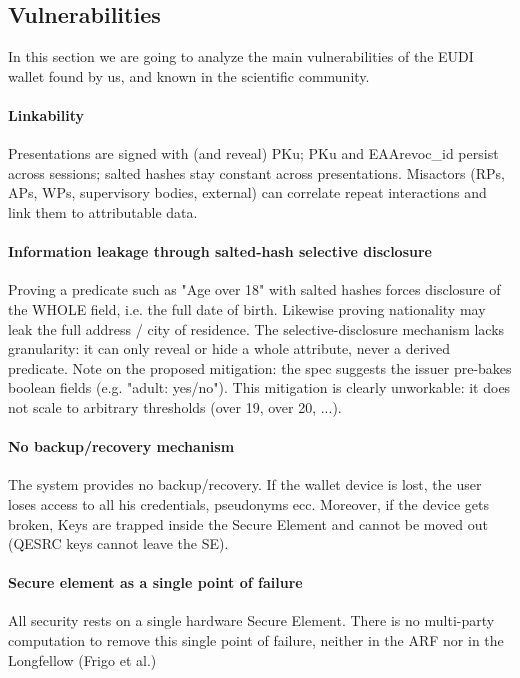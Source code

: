\documentclass{article}
\begin{document}
\subsection{Vulnerabilities}
\label{vulnerabilities}
In this section we are going to analyze the main vulnerabilities of the EUDI wallet found by us, and
known in the scientific community.

\paragraph{Linkability}
Presentations are signed with (and reveal) PKu; PKu and EAArevoc\_id persist
across sessions; salted hashes stay constant across presentations. Misactors
(RPs, APs, WPs, supervisory bodies, external) can correlate repeat
interactions and link them to attributable data.

\paragraph{Information leakage through salted-hash selective disclosure}
Proving a predicate such as "Age over 18" with salted hashes forces disclosure 
of the WHOLE field, i.e. the full date of birth. 
Likewise proving nationality may leak the full address / city of
residence. The selective-disclosure mechanism lacks granularity: it can only
reveal or hide a whole attribute, never a derived predicate.
Note on the proposed mitigation: the spec suggests the issuer pre-bakes
boolean fields (e.g. "adult: yes/no"). This mitigation is clearly unworkable: 
it does not scale to arbitrary thresholds (over 19, over 20, ...).

\paragraph{No backup/recovery mechanism}
The system provides no backup/recovery. If the wallet device is
lost, the user loses access to all his credentials, pseudonyms ecc. 
Moreover, if the device gets broken, Keys are trapped inside the 
Secure Element and cannot be moved out (QESRC keys cannot leave the SE).

\paragraph{Secure element as a single point of failure}
All security rests on a single hardware Secure Element. There is
no multi-party computation to remove this single point of failure, neither in
the ARF nor in the Longfellow (Frigo et al.)
\end{document}
